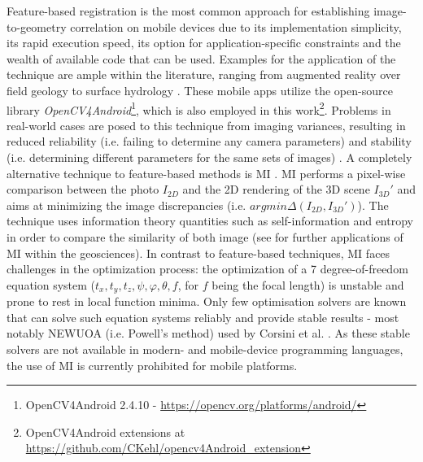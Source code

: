\documentclass[review]{elsarticle}
\begin{document}
Feature-based registration is the most common approach for establishing image-to-geometry correlation on mobile devices due to its implementation simplicity, its rapid execution speed, its option for application-specific constraints and the wealth of available code that can be used. Examples for the application of the technique are ample within the literature, ranging from augmented reality \cite{Gauglitz2014,Sweeney2015} over field geology \cite{Kehl2016_ISPRS,Kehl2017_VGC} to surface hydrology \cite{Kroehnert2017a,Boerner2016}. These mobile apps utilize the open-source library \textit{OpenCV4Android}\footnote{OpenCV4Android 2.4.10 - \url{https://opencv.org/platforms/android/}}, which is also employed in this work\footnote{OpenCV4Android extensions at \url{https://github.com/CKehl/opencv4Android_extension}}. Problems in real-world cases are posed to this technique from imaging variances, resulting in reduced reliability (i.e. failing to determine any camera parameters) and stability (i.e. determining different parameters for the same sets of images) \cite{Kehl2017_PHOR}. A completely alternative technique to feature-based methods is \gls{MI} \cite{Viola1997,Corsini2013}. \Gls{MI} performs a pixel-wise comparison between the photo $I_{2D}$ and the 2D rendering of the 3D scene $I_{3D}'$ and aims at minimizing the image discrepancies (i.e. $argmin \Delta(I_{2D}, I_{3D}')$). The technique uses information theory quantities such as self-information and entropy in order to compare the similarity of both image (see \cite{Bonaventura2017} for further applications of \gls{MI} within the geosciences). In contrast to feature-based techniques, \gls{MI} faces challenges in the optimization process: the optimization of a 7 degree-of-freedom equation system ($t_x,t_y,t_z,\psi,\varphi,\theta,f$, for $f$ being the focal length) is unstable and prone to rest in local function minima. Only few optimisation solvers are known that can solve such equation systems reliably and provide stable results - most notably NEWUOA (i.e. Powell's method\cite{Powell2006}) used by Corsini et al. \cite{Corsini2013}. As these stable solvers are not available in modern- and mobile-device programming languages, the use of \gls{MI} is currently prohibited for mobile platforms.
\end{document}
